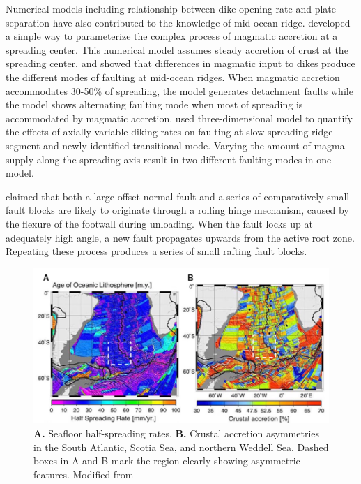 \documentclass[letterpaper,12pt,notitle]{memphisthesis}                     %
\begin{document}
Numerical models including relationship between dike opening rate and plate separation have also contributed to the knowledge of mid-ocean ridge.
\citet{Buck1998} developed a simple way to parameterize the complex process of magmatic accretion at a spreading center. This numerical model assumes steady accretion of crust at the spreading center. \citet{Buck2005} and \citet{Tucholke2008} showed that differences in magmatic input to dikes produce the different modes of faulting at mid-ocean ridges. When magmatic accretion accommodates 30-50\% of spreading, the model generates detachment faults while the model shows alternating faulting mode when most of spreading is accommodated by magmatic accretion. \citet{Tian2017} used three-dimensional model to quantify the effects of axially variable diking rates on faulting at slow spreading ridge segment and newly identified transitional mode. Varying the amount of magma supply along the spreading axis result in two different faulting modes in one model.

\citet{Reston2011} claimed that both a large-offset normal fault and a series of comparatively small fault blocks are likely to originate through a rolling hinge mechanism, caused by the flexure of the footwall during unloading. When the fault locks up at adequately high angle, a new fault propagates upwards from the active root zone. Repeating these process produces a series of small rafting fault blocks.

\begin{figure}[!htb]
	\centering
	\includegraphics[width=0.9\linewidth]{./figs/hsr_muller.png}
	\caption{\textbf{A.} Seafloor half-spreading rates. \textbf{B.} Crustal accretion asymmetries in the South Atlantic, Scotia Sea, and northern Weddell Sea. Dashed boxes in A and B mark the region clearly showing asymmetric features. Modified from \citet{Muller2008}}
	\label{fig:hsr_muller}
\end{figure}
\end{document}
